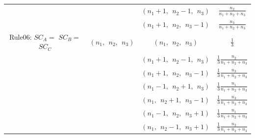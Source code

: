 \documentclass[12pt]{article}
\begin{document}
\begin{center}
\begin{tabular}{|c|c|c|c|}
 &  & $(n_1+1,\ \ n_2-1,\ \ n_3)$ & $\frac{n_2}{n_1+n_2+n_3}$ \\

 &  & $(n_1+1,\ \ n_2,\ \ n_3-1)$ & $\frac{n_3}{n_1+n_2+n_3}$ \\
 \hline
Rule06: $SC_A=$ $SC_B=$ $SC_C$ & $(n_1,\ \ n_2,\ \ n_3)$ & $(n_1,\ \ n_2,\ \ n_3)$ & $\frac{1}{3}$ \\

 &  & $(n_1+1,\ \ n_2-1,\ \ n_3)$ & $\frac{1}{3}\frac{n_2}{n_1+n_2+n_3}$ \\

 &  & $(n_1+1,\ \ n_2,\ \ n_3-1)$ & $\frac{1}{3}\frac{n_3}{n_1+n_2+n_3}$ \\

 &  & $(n_1-1,\ \ n_2+1,\ \ n_3)$ & $\frac{1}{3}\frac{n_1}{n_1+n_2+n_3}$ \\

 &  & $(n_1,\ \ n_2+1,\ \ n_3-1)$ & $\frac{1}{3}\frac{n_3}{n_1+n_2+n_3}$ \\

 &  & $(n_1-1,\ \ n_2,\ \ n_3+1)$ & $\frac{1}{3}\frac{n_1}{n_1+n_2+n_3}$ \\

 &  & $(n_1,\ \ n_2-1,\ \ n_3+1)$ & $\frac{1}{3}\frac{n_2}{n_1+n_2+n_3}$ \\

 \hline

\end{tabular}
\end{center}
\end{document}
